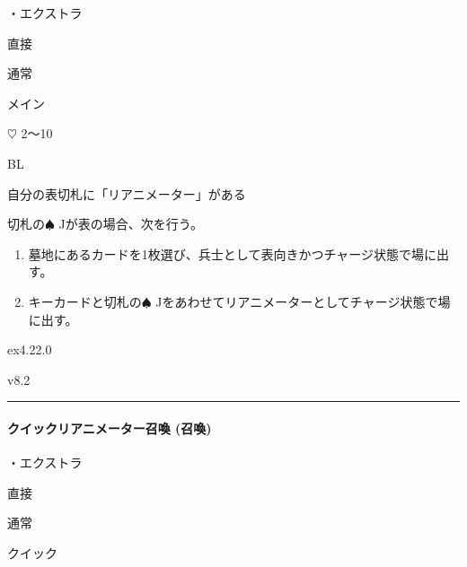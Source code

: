 \documentclass[letterpaper,10pt,dvipdfmx]{sphinxmanual}
\begin{document}
\sphinxAtStartPar
・エクストラ

\sphinxAtStartPar
{} 直接

\sphinxAtStartPar
{} 通常

\sphinxAtStartPar
{} メイン

\sphinxAtStartPar
{} {\normalsize $\heartsuit$} 2〜10

\sphinxAtStartPar
{} BL

\sphinxAtStartPar
{}

\sphinxAtStartPar
自分の表切札に「リアニメーター」がある

\sphinxAtStartPar
{}

\sphinxAtStartPar
切札の{\normalsize $\spadesuit$} Jが表の場合、次を行う。
\begin{enumerate}
%
\item {} 
\sphinxAtStartPar
墓地にあるカードを1枚選び、兵士として表向きかつチャージ状態で場に出す。

\item {} 
\sphinxAtStartPar
キーカードと切札の{\normalsize $\spadesuit$} Jをあわせてリアニメーターとしてチャージ状態で場に出す。

\end{enumerate}

\sphinxAtStartPar
{}  ex4.22.0

\sphinxAtStartPar
{}  v8.2


\bigskip\hrule\bigskip



\paragraph{クイックリアニメーター召喚 (召喚)}
\label{\detokenize{auto/frameActionlist:act-quicksummonreanimator}}\label{\detokenize{auto/frameActionlist:id26}}
\sphinxAtStartPar
{}

\sphinxAtStartPar
・エクストラ

\sphinxAtStartPar
{} 直接

\sphinxAtStartPar
{} 通常

\sphinxAtStartPar
{} クイック
\end{document}

